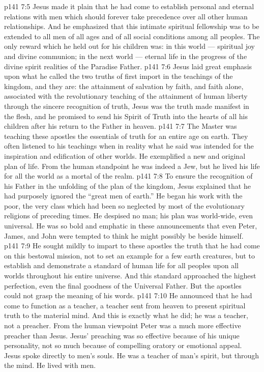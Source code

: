 \vs p141 7:5 Jesus made it plain that he had come to establish personal and eternal relations with men which should forever take precedence over all other human relationships. And he emphasized that this intimate spiritual fellowship was to be extended to all men of all ages and of all social conditions among all peoples. The only reward which he held out for his children was: in this world --- spiritual joy and divine communion; in the next world --- eternal life in the progress of the divine spirit realities of the Paradise Father.
\vs p141 7:6 Jesus laid great emphasis upon what he called the two truths of first import in the teachings of the kingdom, and they are: the attainment of salvation by faith, and faith alone, associated with the revolutionary teaching of the attainment of human liberty through the sincere recognition of truth,  Jesus was the truth made manifest in the flesh, and he promised to send his Spirit of Truth into the hearts of all his children after his return to the Father in heaven.
\vs p141 7:7 The Master was teaching these apostles the essentials of truth for an entire age on earth. They often listened to his teachings when in reality what he said was intended for the inspiration and edification of other worlds. He exemplified a new and original plan of life. From the human standpoint he was indeed a Jew, but he lived his life for all the world as a mortal of the realm.
\vs p141 7:8 To ensure the recognition of his Father in the unfolding of the plan of the kingdom, Jesus explained that he had purposely ignored the “great men of earth.” He began his work with the poor, the very class which had been so neglected by most of the evolutionary religions of preceding times. He despised no man; his plan was world\hyp{}wide, even universal. He was so bold and emphatic in these announcements that even Peter, James, and John were tempted to think he might possibly be beside himself.
\vs p141 7:9 He sought mildly to impart to these apostles the truth that he had come on this bestowal mission, not to set an example for a few earth creatures, but to establish and demonstrate a standard of human life for all peoples upon all worlds throughout his entire universe. And this standard approached the highest perfection, even the final goodness of the Universal Father. But the apostles could not grasp the meaning of his words.
\vs p141 7:10 He announced that he had come to function as a teacher, a teacher sent from heaven to present spiritual truth to the material mind. And this is exactly what he did; he was a teacher, not a preacher. From the human viewpoint Peter was a much more effective preacher than Jesus. Jesus’ preaching was so effective because of his unique personality, not so much because of compelling oratory or emotional appeal. Jesus spoke directly to men’s souls. He was a teacher of man’s spirit, but through the mind. He lived with men.
